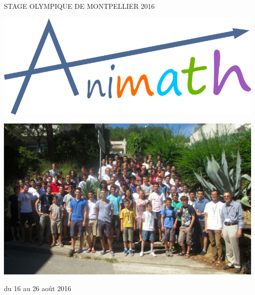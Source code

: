 

\begin{center}\LARGE{\textsc{STAGE OLYMPIQUE DE MONTPELLIER 2016}}
\vrule depth 0pt height 0.4pt width 16cm\end{center}



\begin{center}\includegraphics[scale=0.3]{logos/animath.jpg}
\end{center}



\begin{center}\includegraphics[width=16cm]{groupe.jpg}
\end{center}


\begin{center}\large{du 16 au 26 août 2016}\end{center}




